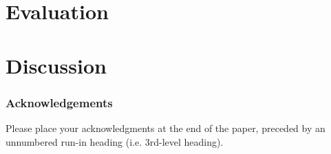 \documentclass[runningheads]{llncs}
\begin{document}

\section{Evaluation}
\section{Discussion}



\subsubsection{Acknowledgements} Please place your acknowledgments at
the end of the paper, preceded by an unnumbered run-in heading (i.e.
3rd-level heading).

%
%
%


\end{document}

